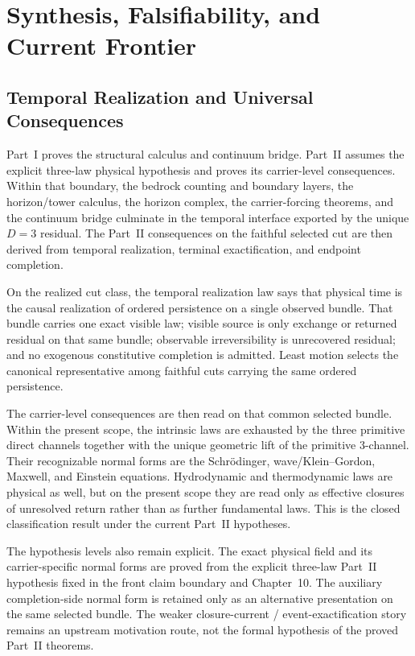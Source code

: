 \section{Synthesis, Falsifiability, and Current Frontier}
\label{sec:discussion}

\subsection{Temporal Realization and Universal Consequences}

Part~I proves the structural calculus and continuum bridge. Part~II assumes
the explicit three-law physical hypothesis and proves its carrier-level
consequences. Within that boundary, the bedrock counting and boundary layers,
the horizon/tower calculus, the horizon complex, the carrier-forcing
theorems, and the continuum bridge culminate in the temporal interface
exported by the unique \(D=3\) residual. The Part~II consequences on the
faithful selected cut are then derived from temporal realization, terminal
exactification, and endpoint completion.

On the realized cut class, the temporal realization law says that physical
time is the causal realization of ordered persistence on a single observed
bundle. That bundle carries one exact visible law; visible source is only
exchange or returned residual on that same bundle; observable irreversibility
is unrecovered residual; and no exogenous constitutive completion is admitted.
Least motion selects the canonical representative among faithful cuts carrying
the same ordered persistence.

The carrier-level consequences are then read on that common selected bundle.
Within the present scope, the intrinsic laws are exhausted by
the three primitive direct channels together with the unique geometric lift of
the primitive \(3\)-channel. Their recognizable normal forms are the
Schr\"odinger, wave/Klein--Gordon, Maxwell, and Einstein equations.
Hydrodynamic and thermodynamic laws are physical as well, but on the present
scope they are read only as effective closures of unresolved return rather
than as further fundamental laws. This is the closed classification result
under the current Part~II hypotheses.

The hypothesis levels also remain explicit. The exact physical field and its
carrier-specific normal forms are proved from the explicit three-law Part~II
hypothesis fixed in the front claim boundary and Chapter~10. The auxiliary
completion-side normal form is retained only as an alternative presentation on
the same selected bundle. The weaker closure-current / event-exactification
story remains an upstream motivation route, not the formal hypothesis of the
proved Part~II theorems.

